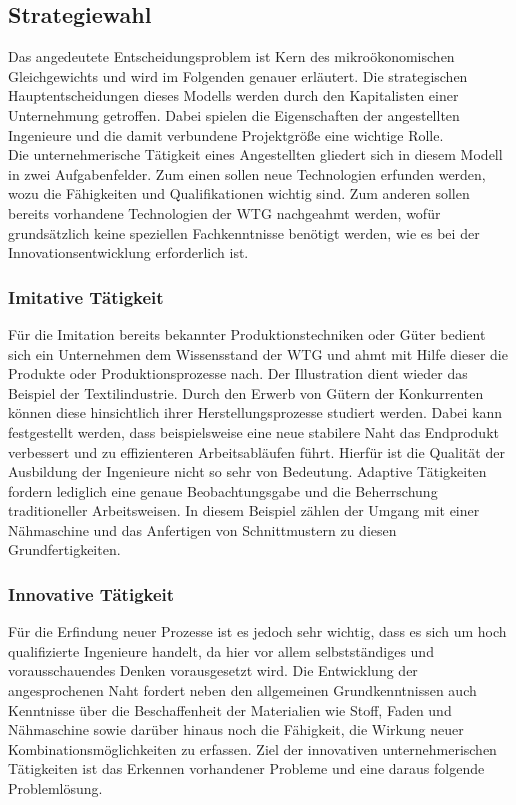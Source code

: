 \subsection{Strategiewahl}\label{sec:Strategiewahl}
Das angedeutete Entscheidungsproblem ist Kern des mikroökonomischen Gleichgewichts und wird im Folgenden genauer erläutert. Die strategischen Hauptentscheidungen dieses Modells werden durch den Kapitalisten einer Unternehmung getroffen. Dabei spielen die Eigenschaften der angestellten Ingenieure und die damit verbundene Projektgröße eine wichtige Rolle. \\
Die unternehmerische Tätigkeit eines Angestellten gliedert sich in diesem Modell in zwei Aufgabenfelder. Zum einen sollen neue Technologien erfunden werden, wozu die Fähigkeiten und Qualifikationen wichtig sind. Zum anderen sollen bereits vorhandene Technologien der WTG nachgeahmt werden, wofür grundsätzlich keine speziellen Fachkenntnisse benötigt werden, wie es bei der Innovationsentwicklung erforderlich ist. 
%
\subsubsection{Imitative Tätigkeit}
Für die Imitation bereits bekannter Produktionstechniken oder Güter bedient sich ein Unternehmen dem Wissensstand der WTG und ahmt mit Hilfe dieser die Produkte oder Produktionsprozesse nach. Der Illustration dient wieder das Beispiel der Textilindustrie. Durch den Erwerb von Gütern der Konkurrenten können diese hinsichtlich ihrer Herstellungsprozesse studiert werden. Dabei kann festgestellt werden, dass beispielsweise eine neue stabilere Naht das Endprodukt verbessert und zu effizienteren Arbeitsabläufen führt. Hierfür ist die Qualität der Ausbildung der Ingenieure nicht so sehr von Bedeutung. Adaptive Tätigkeiten fordern lediglich eine genaue Beobachtungsgabe und die Beherrschung traditioneller Arbeitsweisen. In diesem Beispiel zählen der Umgang mit einer Nähmaschine und das Anfertigen von Schnittmustern zu diesen Grundfertigkeiten.
%
\subsubsection{Innovative Tätigkeit} 
Für die Erfindung neuer Prozesse ist es jedoch sehr wichtig, dass es sich um hoch qualifizierte Ingenieure handelt, da hier vor allem selbstständiges und vorausschauendes Denken vorausgesetzt wird. Die Entwicklung der angesprochenen Naht fordert neben den allgemeinen Grundkenntnissen auch Kenntnisse über die Beschaffenheit der Materialien wie Stoff, Faden und Nähmaschine sowie darüber hinaus noch die Fähigkeit, die Wirkung neuer Kombinationsmöglichkeiten zu erfassen. Ziel der innovativen unternehmerischen Tätigkeiten ist das Erkennen vorhandener Probleme und eine daraus folgende Problemlösung. 
%
